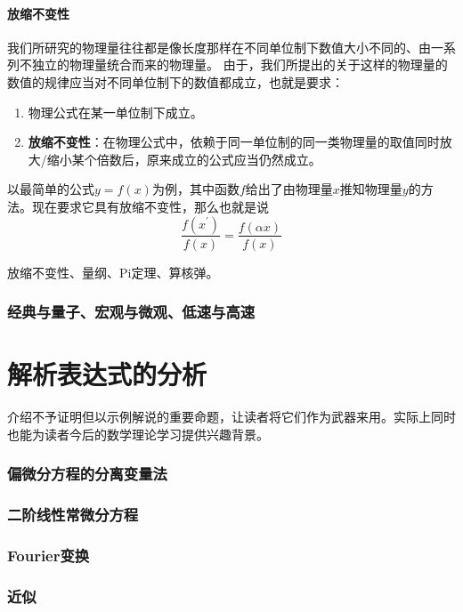 \documentclass[10pt]{article}
\begin{document}
			\subsection{放缩不变性}
				我们所研究的物理量往往都是像长度那样在不同单位制下数值大小不同的、由一系列不独立的物理量统合而来的物理量。
				由于，我们所提出的关于这样的物理量的数值的规律应当对不同单位制下的数值都成立，也就是要求：
				\begin{enumerate}
					\item 物理公式在某一单位制下成立。
					\item \textbf{放缩不变性}：在物理公式中，依赖于同一单位制的同一类物理量的取值同时放大/缩小某个倍数后，原来成立的公式应当仍然成立。
				\end{enumerate}
				
				以最简单的公式\(y=f(x)\)为例，其中函数\(f\)给出了由物理量\(x\)推知物理量\(y\)的方法。现在要求它具有放缩不变性，那么也就是说
				\[\frac{f\left( x^\prime \right)}{f\left( x \right)}=\frac{f\left( \alpha x \right)}{f\left( x \right)}\]%
				




			放缩不变性、量纲、Pi定理、算核弹。


		\section{经典与量子、宏观与微观、低速与高速}

	\part{解析表达式的分析}
		介绍不予证明但以示例解说的重要命题，让读者将它们作为武器来用。实际上同时也能为读者今后的数学理论学习提供兴趣背景。
		
		\section{偏微分方程的分离变量法}
		\section{二阶线性常微分方程}
		\section{Fourier变换}
		\section{近似}
\end{document}
